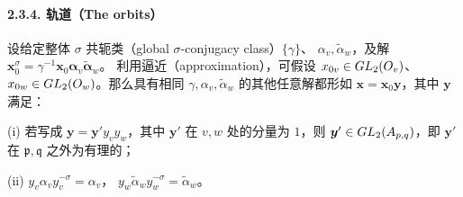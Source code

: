 \paragraph*{2.3.4. 轨道（The orbits）}
设给定整体 $\sigma$ 共轭类（global $\sigma$-conjugacy class）$\{\gamma\}$、
$\alpha_v,\widetilde\alpha_w$，及解
$\boldsymbol x_0^\sigma=\gamma^{-1}\boldsymbol x_0\boldsymbol\alpha_v\widetilde{\boldsymbol\alpha}_w$。
利用逼近（approximation），可假设 $x_{0v}\in GL_2(O_v)$、
$x_{0w}\in GL_2(O_w)$。那么具有相同
$\gamma,\alpha_v,\widetilde\alpha_w$ 的其他任意解都形如
$\boldsymbol x=\boldsymbol x_0\boldsymbol y$，其中 $\boldsymbol y$ 满足：

(i) 若写成 $\boldsymbol y=\boldsymbol y'y_vy_w$，其中 $\boldsymbol y'$ 在 $v,w$ 处的分量为 $1$，则
$\boldsymbol y'\in GL_2(A_{p,q})$，即 $\boldsymbol y'$ 在 $\mathfrak p,\mathfrak q$ 之外为有理的；

(ii) $y_v\alpha_vy_v^{-\sigma}=\alpha_v$，
$y_w\widetilde\alpha_wy_w^{-\sigma}=\widetilde\alpha_w$。

